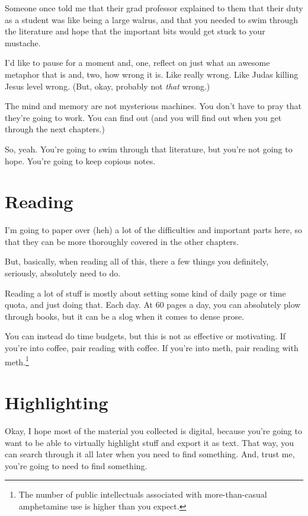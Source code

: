 Someone once told me that their grad professor explained to them that their
duty as a student was like being a large walrus, and that you needed to swim
through the literature and hope that the important bits would get stuck to your
mustache.

I'd like to pause for a moment and, one, reflect on just what an awesome
metaphor that is and, two, how wrong it is. Like really wrong. Like Judas
killing Jesus level wrong. (But, okay, probably not \textit{that} wrong.)

The mind and memory
are not mysterious machines. You don't have to pray that they're going to
work. You can find out (and you will find out when you get through the next chapters.)

So, yeah. You're going to swim through that literature, but you're not going to
hope. You're going to keep copious notes.

\section{Reading}

I'm going to paper over (heh) a lot of the difficulties and important parts
here, so that they can be more thoroughly covered in the other chapters.

But, basically, when reading all of this, there a few things you definitely,
seriously, absolutely need to do.

Reading a lot of stuff is mostly about setting some kind of daily page or time
quota, and just doing that. Each day. At 60 pages a day, you can absolutely plow
through books, but it can be a slog when it comes to dense prose.

You can instead do time budgets, but this is not as effective or motivating. If
you're into coffee, pair reading with coffee. If you're into meth, pair reading with meth.\footnote{The number of public intellectuals associated with more-than-casual amphetamine use is higher than you expect.}

\section{Highlighting}

Okay, I hope most of the material you collected is digital, because you're
going to want to be able to virtually highlight stuff and export it as
text. That way, you can search through it all later when you need to find
something. And, trust me, you're going to need to find something.

